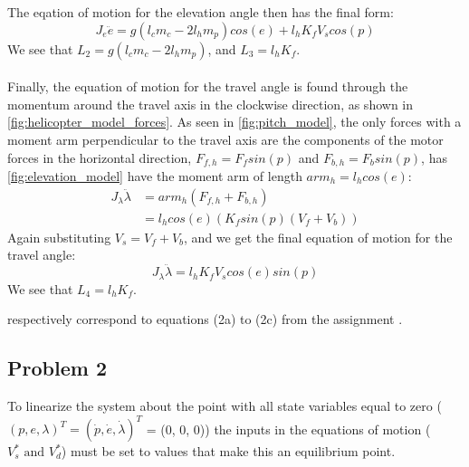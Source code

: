 The eqation of motion for the elevation angle then has the final form:
\begin{equation}
  \label{eq:elevation EoM}
  J_e\ddot{e} = g(l_cm_c - 2l_hm_p)cos(e) + l_hK_fV_scos(p)
\end{equation}
%
We see that $L_2 = g(l_cm_c-2l_hm_p)$, and $L_3 = l_hK_f$.
\\ \\
Finally, the equation of motion for the travel angle is found through
the momentum around the travel axis in the  clockwise direction, as
shown in \cref{fig:helicopter_model_forces}. As seen in
\cref{fig:pitch_model}, the only forces with a moment arm
perpendicular to the travel axis are the components of the motor
forces in the horizontal direction, $F_{f,h} = F_fsin(p)$ and $F_{b,h}
= F_bsin(p)$, has \cref{fig:elevation_model} have the moment arm of
length $arm_h = l_hcos(e)$:
%
\begin{align*}
  J_\lambda\ddot{\lambda} &= arm_h(F_{f,h} + F_{b,h}) \\
                         &= l_hcos(e)(K_fsin(p)(V_f + V_b))
\end{align*}
%
Again substituting $V_s = V_f + V_b$, and we get the final equation of
motion for the travel angle:
%
\begin{equation}
  \label{eq:travel EoM}
  J_\lambda\ddot{\lambda} = l_hK_fV_scos(e)sin(p)
\end{equation}
%
We see that $L_4 = l_hK_f$.

 respectively correspond to equations
(2a) to (2c) from the assignment \cite[p.13]{assignment}.
%
\subsection{Problem 2}
To linearize the system about the point with all state variables equal
to zero ($(p, e, \lambda)^T = (\dot{p},\dot{e},\dot{\lambda})^T $ = (0, 0, 0))
the inputs in the equations of motion ($V^{*}_{s} \text{ and }
V^{*}_{d}$) must be set to values that make this an equilibrium point.

